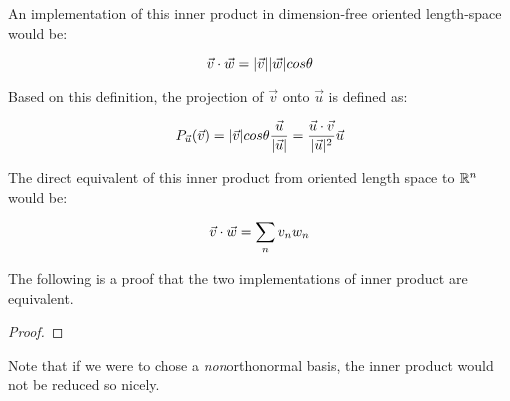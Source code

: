 An implementation of this inner product in dimension-free oriented length-space would be:

$$\vec{v} \cdot \vec{w} = |\vec{v}||\vec{w}|cos\theta$$

Based on this definition, the projection of $\vec{v}$ onto $\vec{u}$ is defined as: 

$$ P_{\vec{u}}(\vec{v}) = |\vec{v}| cos\theta \frac{\vec{u}}{|\vec{u}|} = \frac{\vec{u} \cdot \vec{v}}{|\vec{u}|^2} \vec{u} $$

The direct equivalent of this inner product from oriented length space to $\mathbb{R}^n$ would be:

$$ \vec{v} \cdot \vec{w} = \sum_n v_n w_n $$

The following is a proof that the two implementations of inner product are equivalent. 

\begin{proof}
\end{proof}

Note that if we were to chose a \emph{non}orthonormal basis, the inner product would not be reduced so nicely.



